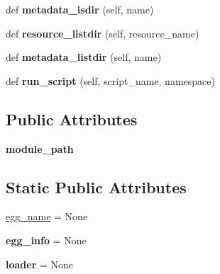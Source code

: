 \begin{DoxyCompactItemize}
\item 
\mbox{\label{classpkg__resources_1_1_null_provider_ac64fbb695098a3754d81882a6b3457da}} 
def {\bfseries metadata\+\_\+isdir} (self, name)
\item 
\mbox{\label{classpkg__resources_1_1_null_provider_acba3c4c30764a40146f28cc1be50808a}} 
def {\bfseries resource\+\_\+listdir} (self, resource\+\_\+name)
\item 
\mbox{\label{classpkg__resources_1_1_null_provider_a3cb806ee524e9fe799811bb789d37591}} 
def {\bfseries metadata\+\_\+listdir} (self, name)
\item 
\mbox{\label{classpkg__resources_1_1_null_provider_a03ae8028263462bb68477eb92f1610a2}} 
def {\bfseries run\+\_\+script} (self, script\+\_\+name, namespace)
\end{DoxyCompactItemize}
\subsection*{Public Attributes}
\begin{DoxyCompactItemize}
\item 
\mbox{\label{classpkg__resources_1_1_null_provider_a90c7b6ef27446c70d03cb2b634b31e97}} 
{\bfseries module\+\_\+path}
\end{DoxyCompactItemize}
\subsection*{Static Public Attributes}
\begin{DoxyCompactItemize}
\item 
\hyperlink{classpkg__resources_1_1_null_provider_a9f438778df10c5f6cf89c050381bb17b}{egg\+\_\+name} = None
\item 
\mbox{\label{classpkg__resources_1_1_null_provider_a739c7496ab220e70cd8d53b9617cd0bf}} 
{\bfseries egg\+\_\+info} = None
\item 
\mbox{\label{classpkg__resources_1_1_null_provider_a824227ff9d57076b31e81215e482615e}} 
{\bfseries loader} = None
\end{DoxyCompactItemize}



